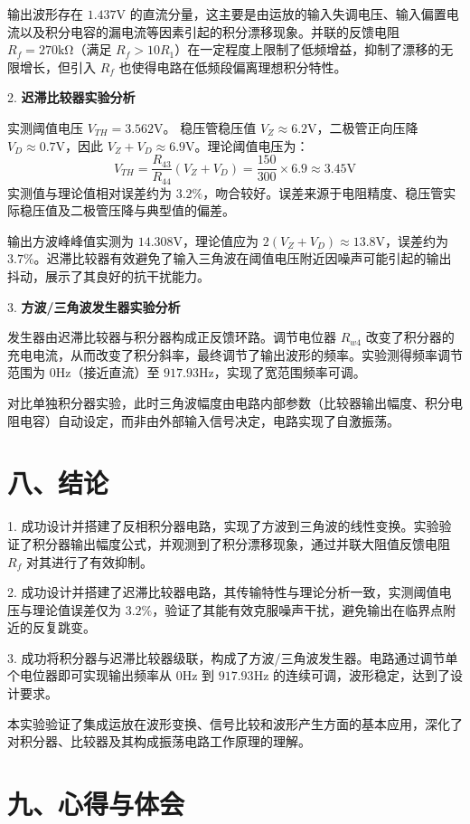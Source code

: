 \documentclass[12pt,a4paper]{article}
\begin{document}
输出波形存在 $1.437\mathrm{V}$ 的直流分量，这主要是由运放的输入失调电压、输入偏置电流以及积分电容的漏电流等因素引起的积分漂移现象。并联的反馈电阻 $R_f=270\mathrm{k\Omega}$（满足 $R_f > 10R_1$）在一定程度上限制了低频增益，抑制了漂移的无限增长，但引入 $R_f$ 也使得电路在低频段偏离理想积分特性。

2. \textbf{迟滞比较器实验分析}

实测阈值电压 $V_{TH}=3.562\mathrm{V}$。
稳压管稳压值 $V_Z \approx 6.2\mathrm{V}$，二极管正向压降 $V_D \approx 0.7\mathrm{V}$，因此 $V_Z+V_D \approx 6.9\mathrm{V}$。理论阈值电压为：
\[
V_{TH} = \frac{R_{43}}{R_{44}}(V_Z+V_D) = \frac{150}{300} \times 6.9 \approx 3.45\mathrm{V}
\]
实测值与理论值相对误差约为 $3.2\%$，吻合较好。误差来源于电阻精度、稳压管实际稳压值及二极管压降与典型值的偏差。

输出方波峰峰值实测为 $14.308\mathrm{V}$，理论值应为 $2(V_Z+V_D) \approx 13.8\mathrm{V}$，误差约为 $3.7\%$。迟滞比较器有效避免了输入三角波在阈值电压附近因噪声可能引起的输出抖动，展示了其良好的抗干扰能力。

3. \textbf{方波/三角波发生器实验分析}

发生器由迟滞比较器与积分器构成正反馈环路。调节电位器 $R_{w4}$ 改变了积分器的充电电流，从而改变了积分斜率，最终调节了输出波形的频率。实验测得频率调节范围为 $0\mathrm{Hz}$（接近直流）至 $917.93\mathrm{Hz}$，实现了宽范围频率可调。

对比单独积分器实验，此时三角波幅度由电路内部参数（比较器输出幅度、积分电阻电容）自动设定，而非由外部输入信号决定，电路实现了自激振荡。
\section*{八、结论}

1. 成功设计并搭建了反相积分器电路，实现了方波到三角波的线性变换。实验验证了积分器输出幅度公式，并观测到了积分漂移现象，通过并联大阻值反馈电阻 $R_f$ 对其进行了有效抑制。

2. 成功设计并搭建了迟滞比较器电路，其传输特性与理论分析一致，实测阈值电压与理论值误差仅为 $3.2\%$，验证了其能有效克服噪声干扰，避免输出在临界点附近的反复跳变。

3. 成功将积分器与迟滞比较器级联，构成了方波/三角波发生器。电路通过调节单个电位器即可实现输出频率从 $0\mathrm{Hz}$ 到 $917.93\mathrm{Hz}$ 的连续可调，波形稳定，达到了设计要求。

本实验验证了集成运放在波形变换、信号比较和波形产生方面的基本应用，深化了对积分器、比较器及其构成振荡电路工作原理的理解。

\section*{九、心得与体会}
\end{document}
